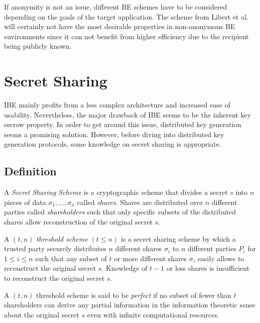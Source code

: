 If anonymity is not an issue, different BE schemes have to be considered depending on the goals of the target application. The scheme from Libert et al.~\cite{art:LibertPQ12} will certainly not have the most desirable properties in non-anonymous BE environments since it can not benefit from higher efficiency due to the recipient being publicly known.

\section{Secret Sharing}
IBE mainly profits from a less complex architecture and increased ease of usability. Nevertheless, the major drawback of IBE seems to be the inherent key escrow property. In order to get around this issue, distributed key generation seems a promising solution. However, before diving into distributed key generation protocols, some knowledge on secret sharing is appropriate.

\subsection{Definition}
\begin{defn}
\label{def:secret_sharing_scheme}
 A \textit{Secret Sharing Scheme} is a cryptographic scheme that divides a secret $s$ into $n$ pieces of data $\sigma_1, \ldots, \sigma_n$ called \textit{shares}. Shares are distributed over $n$ different parties called \textit{shareholders} such that only specific subsets of the distributed shares allow reconstruction of the original secret $s$.
\end{defn}

\begin{defn}
\label{def:threshold_scheme}
 A $\left( t, n \right)$ \textit{threshold scheme} $\left( t \leq n \right)$ is a secret sharing scheme by which a trusted party securely distributes $n$ different shares $\sigma_i$ to $n$ different parties $P_i$ for $1 \leq i \leq n$ such that any subset of $t$ or more different shares $\sigma_i$ easily allows to reconstruct the original secret $s$. Knowledge of $t-1$ or less shares is insufficient to reconstruct the original secret $s$.
\end{defn}

\begin{defn}
\label{def:threshold_scheme}
 A $\left( t, n \right)$ threshold scheme is said to be \textit{perfect} if no subset of fewer than $t$ shareholders can derive any partial information in the information theoretic sense about the original secret $s$ even with infinite computational resources.
\end{defn}

